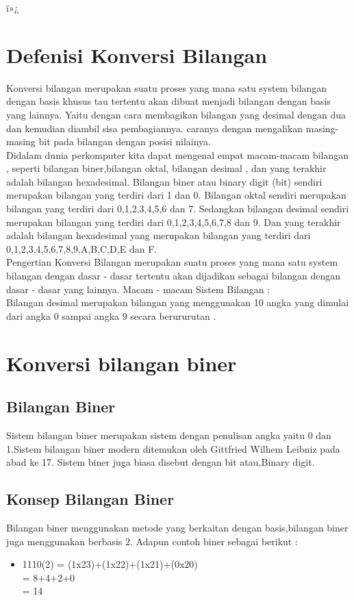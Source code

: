 ï»¿%

\section{Defenisi Konversi Bilangan}
Konversi bilangan merupakan suatu proses yang mana satu system bilangan dengan basis khusus tau tertentu akan dibuat menjadi bilangan dengan basis yang lainnya. 
Yaitu dengan cara membagikan bilangan yang desimal dengan dua dan kemudian diambil sisa pembagiannya.
caranya dengan mengalikan masing-masing bit pada bilangan dengan posisi nilainya.
\\Didalam dunia perkomputer kita dapat mengenal empat macam-macam bilangan , seperti bilangan biner,bilangan oktal, bilangan desimal , dan yang terakhir adalah bilangan hexadesimal. Bilangan biner atau binary digit (bit) sendiri merupakan bilangan yang terdiri dari 1 dan 0. Bilangan oktal sendiri merupakan bilangan yang terdiri dari 0,1,2,3,4,5,6 dan 7.
Sedangkan bilangan desimal sendiri merupakan bilangan yang terdiri dari 0,1,2,3,4,5,6,7,8 dan 9. Dan yang terakhir adalah bilangan hexadesimal yang merupakan bilangan yang terdiri dari 0,1,2,3,4,5,6,7,8,9,A,B,C,D,E dan F.
\\Pengertian Konversi Bilangan merupakan  suatu proses yang mana  satu system bilangan dengan dasar - dasar  tertentu akan dijadikan sebagai bilangan dengan dasar - dasar yang lainnya.
Macam - macam Sistem Bilangan  :
\\Bilangan desimal  merupakan bilangan yang menggunakan 10 angka yang dimulai dari angka 0 sampai angka 9 secara berururutan .
\section{Konversi bilangan biner}
\subsection{Bilangan Biner}
Sistem bilangan biner merupakan sistem dengan penulisan angka yaitu 0 dan 1.Sistem bilangan biner  modern ditemukan oleh Gittfried Wilhem Leibniz pada abad ke 17. Sistem biner juga biasa disebut dengan bit atau,Binary digit.
\subsection{Konsep Bilangan Biner}
Bilangan biner menggunakan metode yang berkaitan dengan basis,bilangan biner juga menggunakan berbasis 2. Adapun contoh biner sebagai berikut : \\
\begin{itemize}
\item 1110(2) = (1x23)+(1x22)+(1x21)+(0x20)\\
   	  = 8+4+2+0\\
             = 14  
\end{itemize}

